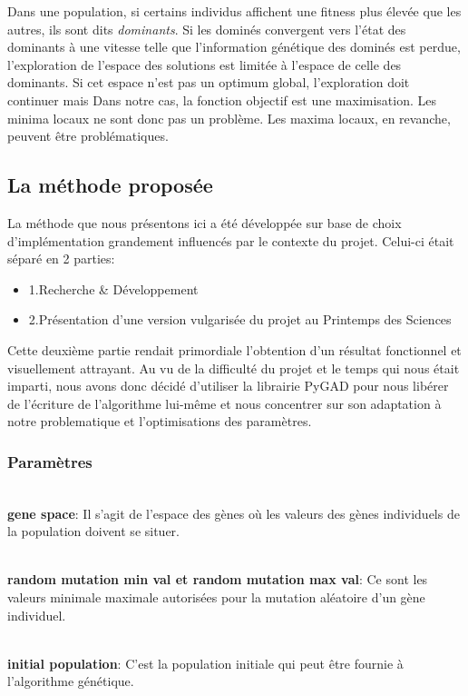 \documentclass[journal, a4paper]{IEEEtran}
\begin{document}
	Dans une population, si certains individus affichent une fitness
	plus élevée que les autres, ils sont dits \emph{dominants}.
	Si les dominés convergent vers l'état des dominants à une vitesse
	telle que l'information génétique des dominés est perdue,
	l'exploration de l'espace des solutions est limitée à l'espace
	de celle des dominants. Si cet espace n'est pas un optimum global,
	l'exploration doit continuer mais
	Dans notre cas, la fonction objectif est une maximisation.
	Les minima locaux ne sont donc pas un problème.
	Les maxima locaux, en revanche, peuvent être problématiques.

	\subsection{La méthode proposée}\label{subsec:la-methode-proposee}
	La méthode que nous présentons ici a été développée sur base de
	choix d'implémentation grandement influencés par le contexte du
	projet.
	Celui-ci était séparé en 2 parties:
	\begin{itemize}
		\item 1.Recherche \& Développement
		\item 2.Présentation d'une version vulgarisée du projet au
		Printemps des Sciences
	\end{itemize}
	Cette deuxième partie rendait primordiale l'obtention d'un
	résultat
	fonctionnel et visuellement attrayant.
	Au vu de la difficulté du projet et le temps qui nous était
	imparti, nous avons donc
	décidé d'utiliser	la librairie PyGAD\cite{pygad}
	pour nous libérer de l'écriture de l'algorithme lui-même et nous
	concentrer sur son adaptation à notre problematique et
	l'optimisations des paramètres.

	\subsubsection{Paramètres}

	\newline
    \\ \textbf{gene space}: Il s'agit de l'espace des gènes où les
	valeurs des gènes individuels de la population doivent se situer.

    \\ \textbf{random mutation min val et random mutation max val}:
	Ce sont les valeurs minimale maximale
	autorisées pour la mutation aléatoire d'un gène individuel.

    \\ \textbf{initial population}: C'est la population initiale
	qui peut être fournie à l'algorithme génétique. %
\end{document}
